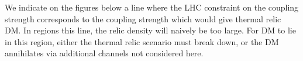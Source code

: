 We indicate on the figures below a line where the LHC constraint on the coupling strength corresponds to the coupling strength which would give thermal relic DM. In regions  this line, the relic density will naively be too large. For DM to lie in this region, either the thermal relic scenario must break down, or the DM annihilates via additional channels not considered here.